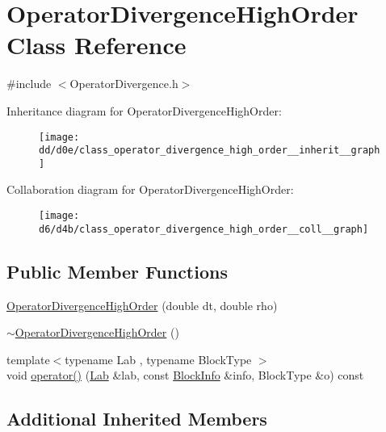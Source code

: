 \hypertarget{class_operator_divergence_high_order}{}\section{Operator\+Divergence\+High\+Order Class Reference}
\label{class_operator_divergence_high_order}


{\ttfamily \#include $<$Operator\+Divergence.\+h$>$}



Inheritance diagram for Operator\+Divergence\+High\+Order\+:\nopagebreak
\begin{figure}[H]
\begin{center}
\leavevmode
\texttt{[image: dd/d0e/class\_operator\_divergence\_high\_order\_\_inherit\_\_graph]}
\end{center}
\end{figure}


Collaboration diagram for Operator\+Divergence\+High\+Order\+:\nopagebreak
\begin{figure}[H]
\begin{center}
\leavevmode
\texttt{[image: d6/d4b/class\_operator\_divergence\_high\_order\_\_coll\_\_graph]}
\end{center}
\end{figure}
\subsection*{Public Member Functions}
\begin{DoxyCompactItemize}
\item 
\hyperlink{class_operator_divergence_high_order_aba5019b17ebf12926fca631c503dd21d}{Operator\+Divergence\+High\+Order} (double dt, double rho)
\item 
\hyperlink{class_operator_divergence_high_order_a022a0d3cc7413724ca51f54f411c701e}{$\sim$\+Operator\+Divergence\+High\+Order} ()
\item 
{\footnotesize template$<$typename Lab , typename Block\+Type $>$ }\\void \hyperlink{class_operator_divergence_high_order_a9e4c5786679fb26492c19a8ef2fe1051}{operator()} (\hyperlink{_definitions_8h_ad6f951af9a2a6ebc1975404882b34314}{Lab} \&lab, const \hyperlink{struct_block_info}{Block\+Info} \&info, Block\+Type \&o) const 
\end{DoxyCompactItemize}
\subsection*{Additional Inherited Members}


